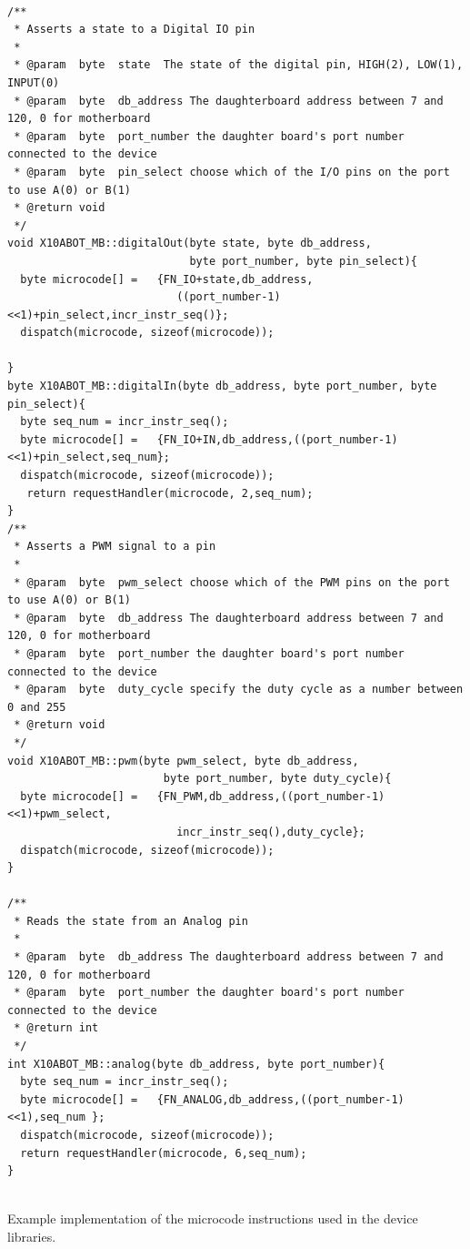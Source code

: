 \begin{listing}[h]
\footnotesize
{\fontsize{8}{6}\selectfont
\begin{verbatim}

/**
 * Asserts a state to a Digital IO pin
 *
 * @param  byte  state  The state of the digital pin, HIGH(2), LOW(1), INPUT(0)
 * @param  byte  db_address The daughterboard address between 7 and 120, 0 for motherboard
 * @param  byte  port_number the daughter board's port number connected to the device
 * @param  byte  pin_select choose which of the I/O pins on the port to use A(0) or B(1)
 * @return void
 */
void X10ABOT_MB::digitalOut(byte state, byte db_address, 
                            byte port_number, byte pin_select){
  byte microcode[] =   {FN_IO+state,db_address,
                          ((port_number-1)<<1)+pin_select,incr_instr_seq()};
  dispatch(microcode, sizeof(microcode));

}
byte X10ABOT_MB::digitalIn(byte db_address, byte port_number, byte pin_select){
  byte seq_num = incr_instr_seq();
  byte microcode[] =   {FN_IO+IN,db_address,((port_number-1)<<1)+pin_select,seq_num};
  dispatch(microcode, sizeof(microcode));
   return requestHandler(microcode, 2,seq_num);
}
/**
 * Asserts a PWM signal to a pin
 *
 * @param  byte  pwm_select choose which of the PWM pins on the port to use A(0) or B(1)
 * @param  byte  db_address The daughterboard address between 7 and 120, 0 for motherboard
 * @param  byte  port_number the daughter board's port number connected to the device
 * @param  byte  duty_cycle specify the duty cycle as a number between 0 and 255
 * @return void
 */
void X10ABOT_MB::pwm(byte pwm_select, byte db_address, 
                        byte port_number, byte duty_cycle){
  byte microcode[] =   {FN_PWM,db_address,((port_number-1)<<1)+pwm_select,
                          incr_instr_seq(),duty_cycle};
  dispatch(microcode, sizeof(microcode));
}

/**
 * Reads the state from an Analog pin
 *
 * @param  byte  db_address The daughterboard address between 7 and 120, 0 for motherboard
 * @param  byte  port_number the daughter board's port number connected to the device
 * @return int
 */
int X10ABOT_MB::analog(byte db_address, byte port_number){
  byte seq_num = incr_instr_seq();
  byte microcode[] =   {FN_ANALOG,db_address,((port_number-1)<<1),seq_num };
  dispatch(microcode, sizeof(microcode));
  return requestHandler(microcode, 6,seq_num);
}


\end{verbatim}
}
\caption{Example implementation of the \xten microcode instructions used in the device libraries.} \label{code:micro}
\end{listing}	


